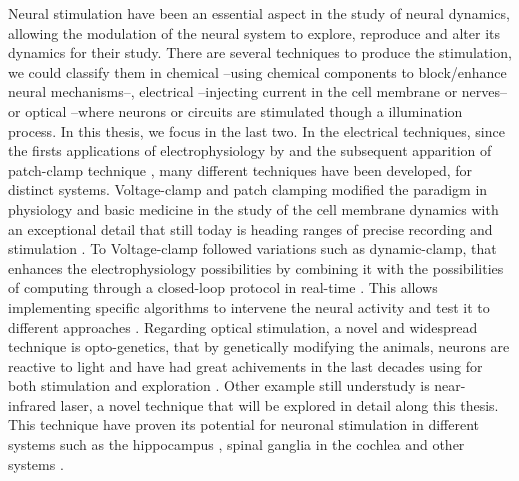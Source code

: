 Neural stimulation have been an essential aspect in the study of neural dynamics, allowing the modulation of the neural system to explore, reproduce and alter its dynamics for their study. There are several techniques to produce the stimulation, we could classify them in chemical --using chemical components to block/enhance neural mechanisms--, electrical --injecting current in the cell membrane or nerves-- or optical --where neurons or circuits are stimulated though a illumination process. In this thesis, we focus in the last two. In the electrical techniques, since the firsts applications of electrophysiology by \cite{neher_single-channel_1976} and the subsequent apparition of patch-clamp technique \cite{hamill_improved_1981}, many different techniques have been developed, for distinct systems. Voltage-clamp and patch clamping modified the paradigm in physiology and basic medicine in the study of the cell membrane dynamics with an exceptional detail that still today is heading ranges of precise recording and stimulation \parencite{hamill_improved_1981}. To Voltage-clamp followed variations such as dynamic-clamp, that enhances the electrophysiology possibilities by combining it with the possibilities of computing through a closed-loop protocol in real-time \parencite{nowotny_dynamic_2022}. This allows implementing specific algorithms to intervene the neural activity and test it to different approaches \parencite{chamorro_generalization_2012}. 
Regarding optical stimulation, a novel and widespread technique is opto-genetics, that by genetically modifying the animals, neurons are reactive to light and have had great achivements in the last decades using for both stimulation and exploration \parencite{chen_roles_2022}. Other example still understudy is near-infrared laser, a novel technique that will be explored in detail along this thesis. This technique have proven its potential for neuronal stimulation in different systems such as the hippocampus \parencite{liang_temperature-dependent_2009}, spinal ganglia in the cochlea \cite{goyal_acute_2012, barrett_pulsed_2018, brown_thermal_2020} and other systems \parencite{shapiro_infrared_2012, cayce_infrared_2014, begeng_activity_2022}.

%

